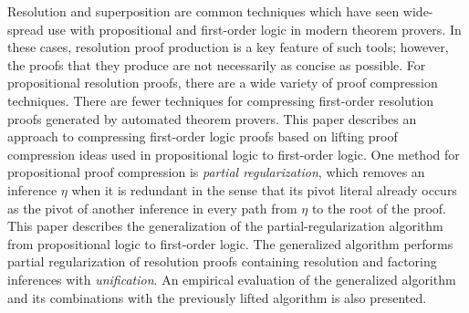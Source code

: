 \sloppy
Resolution and superposition are common techniques
which have seen wide-spread use with 
propositional and 
first-order logic in modern theorem provers. 
In these cases, resolution proof production is a key feature of such tools; however, the proofs that they produce are not necessarily as concise as possible.
For propositional resolution proofs, there are a wide variety of proof compression techniques. There are fewer techniques for compressing first-order resolution proofs generated by automated theorem provers.
This paper describes an approach to compressing first-order logic proofs based on lifting proof compression ideas used in propositional logic to first-order logic. One method for propositional proof compression is \emph{partial regularization}, which removes an inference $\eta$ when it is redundant in the sense that its pivot literal already occurs as the pivot of another inference in every path from $\eta$ to the root of the proof. 
This paper describes the generalization of the partial-regularization algorithm
\RecyclePivotsIntersection \cite{LURPI}
from propositional logic to first-order logic. The generalized algorithm performs partial regularization of resolution proofs containing resolution and factoring inferences with \emph{unification}. %
An empirical evaluation of the generalized algorithm and its combinations with the previously lifted \SFOLowerUnits algorithm
\cite{GFOLU} is also presented.




